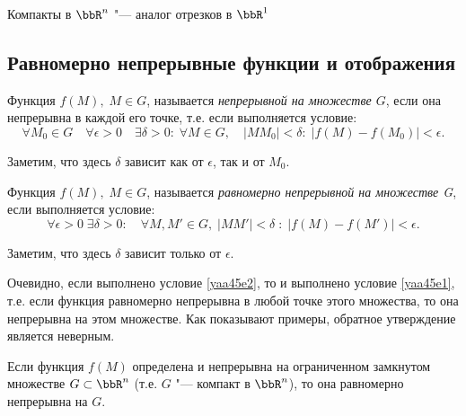Компакты в $\bbR^n$ "--- аналог отрезков в $\bbR^1$



\subsection{Равномерно непрерывные функции и отображения}

\begin{defn}
Функция $f(M),\;M\in G$, называется \textit{непрерывной на множестве $G$}, если она непрерывна в каждой его точке, т.е. если выполняется условие:
\begin{equation}\label{yaa45e1}
\forall M_0\in G\quad \forall\epsilon>0 \quad \exists\delta>0:\;\forall M\in G,\quad |MM_0|<\delta:\;|f(M)-f(M_0)|<\epsilon.
\end{equation}
\end{defn}
Заметим, что здесь $\delta$ зависит как от $\epsilon$, так и от $M_0$.

\begin{defn}
Функция $f(M),\; M\in G$, называется \textit{равномерно непрерывной на множестве G}, если выполняется условие:
\begin{equation}\label{yaa45e2}
\forall\epsilon>0\;\exists\delta>0:\quad\forall M, M'\in G,\; |MM'|<\delta\; :\; |f(M)-f(M')|<\epsilon.
\end{equation}
\end{defn}
Заметим, что здесь $\delta$ зависит только от $\epsilon$.

Очевидно, если выполнено условие \eqref{yaa45e2}, то и выполнено условие \eqref{yaa45e1}, т.е. если функция равномерно непрерывна в любой точке этого множества, то она непрерывна на этом множестве. Как показывают примеры, обратное утверждение является неверным.

\begin{thm}
Если функция $f(M)$ определена и непрерывна на ограниченном замкнутом множестве $G\subset\bbR^n$ (т.е. $G$ "--- компакт в $\bbR^n$), то она равномерно непрерывна на $G$.
\end{thm}

